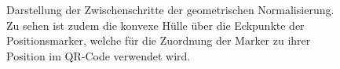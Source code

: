 \documentclass[a4paper, oneside, 12pt]{article}
\begin{document}
\begin{figure}[t]
	\begin{center}
	\end{center}
	\caption[Darstellung der Zwischenschritte der geometrischen Normalisierung]{Darstellung der Zwischenschritte der geometrischen Normalisierung. Zu sehen ist zudem die konvexe Hülle über die Eckpunkte der Positionsmarker, welche für die Zuordnung der Marker zu ihrer Position im QR-Code verwendet wird.}
	\label{fig:geometrie}
\end{figure}
\end{document}
